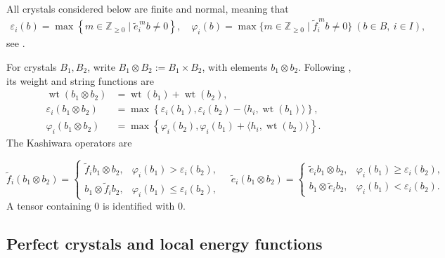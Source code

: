 \documentclass[11pt,reqno]{amsart}
\newcommand{\wt}{\operatorname{wt}}
\numberwithin{table}{section}
\numberwithin{equation}{section}
\theoremstyle{plain}
\theoremstyle{definition}
\begin{document}
All crystals considered below are finite and normal, meaning that
\begin{equation}\label{eq:normal-string-functions}
	\begin{aligned}
		\varepsilon_i(b)
		=
		\max\left\{
		m\in\mathbb Z_{\ge0}
		\mid
		\widetilde e_i^{\,m}b\ne0
		\right\},\quad
		\varphi_i(b)
		=
		\max \{
		m\in\mathbb Z_{\ge0}
		\mid
		\widetilde f_i^{\,m}b\ne0
		 \}
		\ (b\in B,\ i\in I),
	\end{aligned}
\end{equation}
see \cite[equation~(2.2.15)]{KMN1}.

For crystals \(B_1,B_2\), write
\(B_1\otimes B_2:=B_1\times B_2\), with elements
\(b_1\otimes b_2\).
Following \cite[equations~(2.2.16)--(2.2.19) and
Lemma~2.2.4(ii)]{KMN1}, its weight and string functions are
\begin{equation}\label{eq:tensor-string-functions}
	\begin{aligned}
		\wt(b_1\otimes b_2)
		&=
		\wt(b_1)+\wt(b_2),\\
		\varepsilon_i(b_1\otimes b_2)
		&=
		\max\left\{
		\varepsilon_i(b_1),
		\varepsilon_i(b_2)-\langle h_i,\wt(b_1)\rangle
		\right\},\\
		\varphi_i(b_1\otimes b_2)
		&=
		\max\left\{
		\varphi_i(b_2),
		\varphi_i(b_1)+\langle h_i,\wt(b_2)\rangle
		\right\}.
	\end{aligned}
\end{equation}
The Kashiwara operators are

\begin{equation}\label{eq:tensor-fe}
	\widetilde f_i(b_1\otimes b_2)
	=
	\begin{cases}
		\widetilde f_i b_1\otimes b_2,
		&\varphi_i(b_1)>\varepsilon_i(b_2),\\
		b_1\otimes\widetilde f_i b_2,
		&\varphi_i(b_1)\le\varepsilon_i(b_2),
	\end{cases}
	\quad
	\widetilde e_i(b_1\otimes b_2)
	=
	\begin{cases}
		\widetilde e_i b_1\otimes b_2,
		&\varphi_i(b_1)\ge\varepsilon_i(b_2),\\
		b_1\otimes\widetilde e_i b_2,
		&\varphi_i(b_1)<\varepsilon_i(b_2).
	\end{cases}
\end{equation}
A tensor containing \(0\) is identified with \(0\).

\subsection{Perfect crystals and local energy functions}
\end{document}

